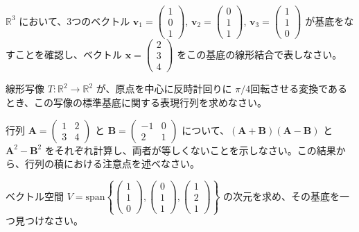 \begin{quiz}
$\mathbb{R}^3$ において、3つのベクトル $\bm{v}_1 = \begin{pmatrix} 1 \\ 0 \\ 1 \end{pmatrix}$, $\bm{v}_2 = \begin{pmatrix} 0 \\ 1 \\ 1 \end{pmatrix}$, $\bm{v}_3 = \begin{pmatrix} 1 \\ 1 \\ 0 \end{pmatrix}$ が基底をなすことを確認し、ベクトル $\bm{x} = \begin{pmatrix} 2 \\ 3 \\ 4 \end{pmatrix}$ をこの基底の線形結合で表しなさい。
\end{quiz}

\begin{quiz}
線形写像 $T: \mathbb{R}^2 \to \mathbb{R}^2$ が、原点を中心に反時計回りに $\pi/4$回転させる変換であるとき、この写像の標準基底に関する表現行列を求めなさい。
\end{quiz}

\begin{quiz}
行列 $\bm{A} = \begin{pmatrix} 1 & 2 \\ 3 & 4 \end{pmatrix}$ と $\bm{B} = \begin{pmatrix} -1 & 0 \\ 2 & 1 \end{pmatrix}$ について、$(\bm{A}+\bm{B})(\bm{A}-\bm{B})$ と $\bm{A}^2 - \bm{B}^2$ をそれぞれ計算し、両者が等しくないことを示しなさい。この結果から、行列の積における注意点を述べなさい。
\end{quiz}

\begin{quiz}
ベクトル空間 $V = \text{span}\left\{ \begin{pmatrix} 1 \\ 1 \\ 0 \end{pmatrix}, \begin{pmatrix} 0 \\ 1 \\ 1 \end{pmatrix}, \begin{pmatrix} 1 \\ 2 \\ 1 \end{pmatrix} \right\}$ の次元を求め、その基底を一つ見つけなさい。
\end{quiz}

